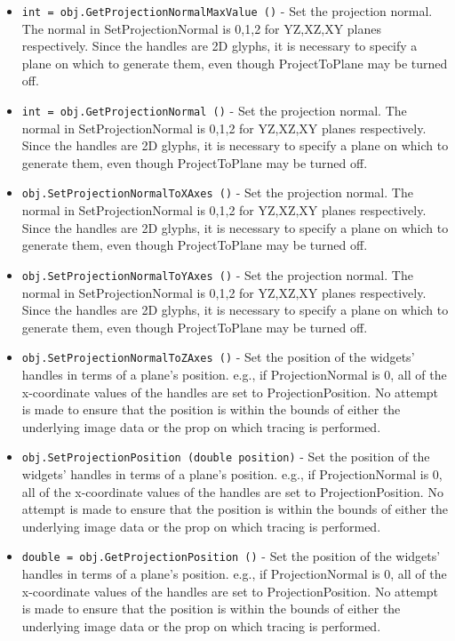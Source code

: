 \begin{itemize}
\item  \verb|int = obj.GetProjectionNormalMaxValue ()| -  Set the projection normal.  The normal in SetProjectionNormal is 0,1,2
 for YZ,XZ,XY planes respectively.  Since the handles are 2D glyphs, it is
 necessary to specify a plane on which to generate them, even though
 ProjectToPlane may be turned off.

\item  \verb|int = obj.GetProjectionNormal ()| -  Set the projection normal.  The normal in SetProjectionNormal is 0,1,2
 for YZ,XZ,XY planes respectively.  Since the handles are 2D glyphs, it is
 necessary to specify a plane on which to generate them, even though
 ProjectToPlane may be turned off.

\item  \verb|obj.SetProjectionNormalToXAxes ()| -  Set the projection normal.  The normal in SetProjectionNormal is 0,1,2
 for YZ,XZ,XY planes respectively.  Since the handles are 2D glyphs, it is
 necessary to specify a plane on which to generate them, even though
 ProjectToPlane may be turned off.

\item  \verb|obj.SetProjectionNormalToYAxes ()| -  Set the projection normal.  The normal in SetProjectionNormal is 0,1,2
 for YZ,XZ,XY planes respectively.  Since the handles are 2D glyphs, it is
 necessary to specify a plane on which to generate them, even though
 ProjectToPlane may be turned off.

\item  \verb|obj.SetProjectionNormalToZAxes ()| -  Set the position of the widgets' handles in terms of a plane's position.
 e.g., if ProjectionNormal is 0, all of the x-coordinate values of the
 handles are set to ProjectionPosition.  No attempt is made to ensure that
 the position is within the bounds of either the underlying image data or
 the prop on which tracing is performed.

\item  \verb|obj.SetProjectionPosition (double position)| -  Set the position of the widgets' handles in terms of a plane's position.
 e.g., if ProjectionNormal is 0, all of the x-coordinate values of the
 handles are set to ProjectionPosition.  No attempt is made to ensure that
 the position is within the bounds of either the underlying image data or
 the prop on which tracing is performed.

\item  \verb|double = obj.GetProjectionPosition ()| -  Set the position of the widgets' handles in terms of a plane's position.
 e.g., if ProjectionNormal is 0, all of the x-coordinate values of the
 handles are set to ProjectionPosition.  No attempt is made to ensure that
 the position is within the bounds of either the underlying image data or
 the prop on which tracing is performed.


\end{itemize}
